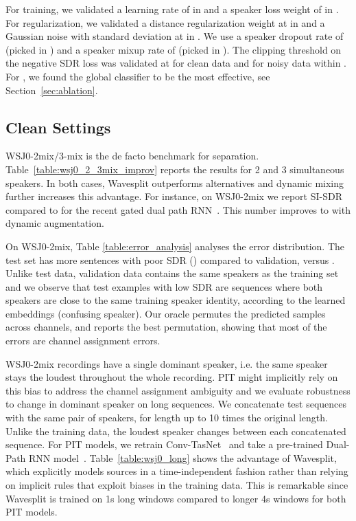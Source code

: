 \documentclass[letterpaper, onecolumn,10 pt]{IEEEtran}
\newcommand{\sdr}{SDR}
\begin{document}
For training, we validated a learning rate of  in  and a speaker loss weight of  in . For regularization, we validated a distance regularization weight at  in  and a Gaussian noise with standard deviation at  in . We use a speaker dropout rate of  (picked in ) and a speaker mixup rate of  (picked in ). The clipping threshold on the negative SDR loss was validated at  for clean data and  for noisy data within .
For , we found the global classifier to be the most effective, see Section~\ref{sec:ablation}.

\subsection{Clean Settings}
\label{sec:clean_setting}

WSJ0-2mix/3-mix is the de facto benchmark for separation.
Table~\ref{table:wsj0_2_3mix_improv} reports the results for 2 and 3 simultaneous speakers. In both cases, Wavesplit outperforms alternatives
and dynamic mixing further increases this advantage. For instance, on WSJ0-2mix we report  SI-SDR compared to  for the recent gated dual path RNN~\cite{nachmani2020voice}. This number improves to  with dynamic augmentation.

On WSJ0-2mix, Table \ref{table:error_analysis} analyses the error distribution. The test set has more sentences with poor \sdr{} () compared to validation,  versus . Unlike test data, validation data contains the same speakers as the training set and we observe that test examples with low \sdr{} are sequences where both speakers are close to the same training speaker identity, according to the learned embeddings (confusing speaker). Our oracle permutes the predicted samples across channels, and reports the best permutation, showing that most of the errors are channel assignment errors.

WSJ0-2mix recordings have a single dominant speaker, i.e. the same speaker stays
the loudest throughout the whole recording. PIT might implicitly rely on this bias
to address the channel assignment ambiguity and we evaluate robustness to change in dominant speaker on long sequences. We concatenate test sequences with the same pair of speakers, for length up to 10 times the original length. Unlike the training data, the loudest speaker changes between each concatenated sequence. For PIT models, we retrain Conv-TasNet~\cite{convtasnet_github} and take a pre-trained Dual-Path RNN model~\cite{dprnn_github}. Table~\ref{table:wsj0_long} shows the advantage of Wavesplit, which explicitly models sources in a time-independent fashion rather than relying on implicit rules that exploit biases in the training data. This is remarkable since Wavesplit is trained on 1s long windows compared to longer 4s windows for both PIT models.
\end{document}
